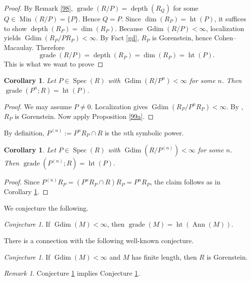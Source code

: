 \documentclass[11.05pt,a4paper]{amsart}
\newtheorem{corollary}[theorem]{Corollary}
\theoremstyle{definition}
\theoremstyle{remark}
\newtheorem{remark}[theorem]{Remark}\newtheorem{fact}[theorem]{Fact}
\newtheorem{conjecture}[theorem]{Conjecture}
\newcommand{\grade}{\operatorname{grade}}
\newcommand{\Min}{\operatorname{Min}}
\newcommand{\Spec}{\operatorname{Spec}}
\newcommand{\Gdim}{\operatorname{Gdim}}
\newcommand{\Ann}{\operatorname{Ann}}
\newcommand{\depth}{\operatorname{depth}}
\begin{document}
\begin{proof}
	By Remark \ref{98}, $\grade(R/P) = \depth(R_Q)$ for some $Q \in \Min(R/P)=\{P\}$. Hence $Q=P$.  
	Since $\dim(R_P) = \operatorname{ht}(P)$, it suffices to show $\depth(R_P)=\dim(R_P)$.
Because $\Gdim(R/P) < \infty$, localization yields $\Gdim(R_P/PR_P) < \infty$. By Fact \ref{gd}, $R_P$ is Gorenstein, hence Cohen–Macaulay. Therefore
	\[
	\grade(R/P)= \depth(R_P) = \dim(R_P) = \operatorname{ht}(P).
	\]This is what we want to prove
\end{proof}

\begin{corollary}\label{99}
	Let $P \in \Spec(R)$ with $\Gdim(R/P^ n) < \infty$ for some $n$. Then $\grade(P^{n}; R) = \operatorname{ht}(P)$.
\end{corollary}

\begin{proof}
	We may assume $P\neq 0$. Localization gives $\Gdim(R_P/P^ nR_P) < \infty$. By \cite[Proposition 1.6]{CT}, $R_P$ is Gorenstein. Now apply Proposition \ref{99a}.
\end{proof}

By definition, $P^{(n)}:=P^{n} R_P\cap R$ is the $n$th symbolic power.

\begin{corollary}\label{100}
	Let $P \in \Spec(R)$ with $\Gdim(R/P^{(n)}) < \infty$ for some $n$. Then $\grade(P^{(n)}; R) = \operatorname{ht}(P)$.
\end{corollary}

\begin{proof}
	Since $P^{(n)} R_P =(P^{n} R_P\cap R) R_P= P^n R_P$, the claim follows as in Corollary \ref{99}.
\end{proof}

We conjecture the following.

\begin{conjecture}\label{con}
	If $\Gdim(M) < \infty$, then
	\(
	\grade(M) = \operatorname{ht}(\Ann(M)).
	\)
\end{conjecture}

There is a connection with the following well-known conjecture.

\begin{conjecture}\label{f}	
	If $\Gdim(M) < \infty$ and $M$ has finite length, then $R$ is Gorenstein.
\end{conjecture}

\begin{remark}
	Conjecture \ref{f} implies Conjecture \ref{con}.
\end{remark}
\end{document}
